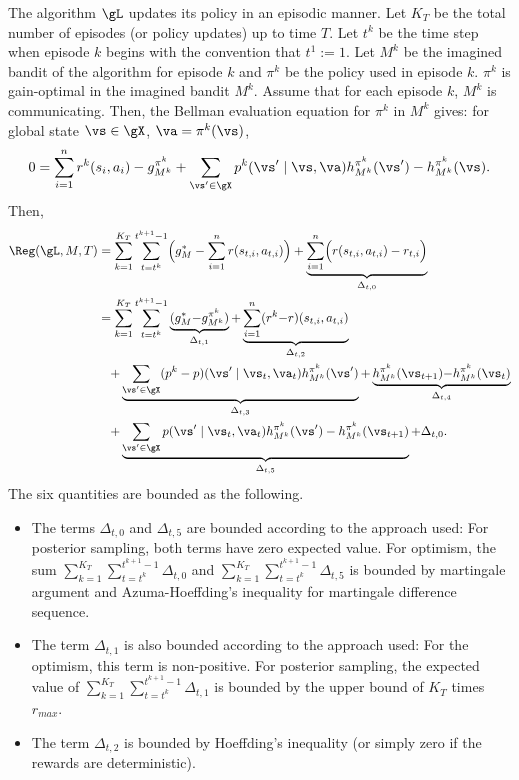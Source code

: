 The algorithm $\gL$ updates its policy in an episodic manner. %
Let $K_T$ be the total number of episodes (or policy updates) up to time $T$.
Let $t^k$ be the time step when episode $k$ begins with the convention that $t^1:=1$.
Let $M^k$ be the imagined bandit of the algorithm for episode $k$ and $\pi^k$ be the policy used in episode $k$.
$\pi^k$ is gain-optimal in the imagined bandit $M^k$.
Assume that for each episode $k$, $M^k$ is communicating.
Then, the Bellman evaluation equation for $\pi^k$ in $M^k$ gives: for global state $\vs\in\gX$, $\va=\pi^k(\vs)$,
\begin{align*}
    0 =  \sum_{i=1}^nr^k(s_i, a_i) -g^{\pi^k}_{M^k} +\sum_{\vs'\in\gX}p^k(\vs' \mid \vs, \va)h^{\pi^k}_{M^k}(\vs') -h^{\pi^k}_{M^k}(\vs).
\end{align*}
Then,
\begin{align*}
    \Reg(\gL, M, T)
    &= \sum_{k=1}^{K_T}\sum_{t=t^k}^{t^{k+1}-1} \Bigl(g^*_M -\sum_{i=1}^{n}r(s_{t,i},a_{t,i})\Bigr) +\underbrace{\sum_{i=1}^{n}\Bigl(r(s_{t,i},a_{t,i})-r_{t,i}\Bigr)}_{\Delta_{t,0}} \\
    &=\sum_{k=1}^{K_T}\sum_{t=t^k}^{t^{k+1}-1} \underbrace{(g^*_M{-}g^{\pi^k}_{M^k})}_{\Delta_{t,1}} {+}\underbrace{\sum_{i=1}^n(r^k{-}r)(s_{t,i},a_{t,i})}_{\Delta_{t,2}} \\
    &\quad {+}\underbrace{\sum_{\vs'\in\gX}(p^k-p)(\vs' \mid \vs_t, \va_t)h^{\pi^k}_{M^k}(\vs')}_{\Delta_{t,3}} {+}\underbrace{h^{\pi^k}_{M^k}(\vs_{t+1}){-}h^{\pi^k}_{M^k}(\vs_{t})}_{\Delta_{t,4}} \\
    &\quad {+}\underbrace{\sum_{\vs'\in\gX} p(\vs' \mid \vs_t, \va_t)h^{\pi^k}_{M^k}(\vs')-h^{\pi^k}_{M^k}(\vs_{t+1})}_{\Delta_{t,5}} +\Delta_{t,0}.
\end{align*}
The six quantities are bounded as the following. %

\begin{itemize}
    \item The terms $\Delta_{t,0}$ and $\Delta_{t,5}$ are bounded according to the approach used: For posterior sampling, both terms have zero expected value. For optimism, the sum $\sum_{k=1}^{K_T}\sum_{t=t^k}^{t^{k+1}-1}\Delta_{t,0}$ and $\sum_{k=1}^{K_T}\sum_{t=t^k}^{t^{k+1}-1}\Delta_{t,5}$ is bounded by martingale argument and Azuma-Hoeffding's inequality for martingale difference sequence.
    \item The term $\Delta_{t,1}$ is also bounded according to the approach used: For the optimism, this term is non-positive. For posterior sampling, the expected value of $\sum_{k=1}^{K_T}\sum_{t=t^k}^{t^{k+1}-1}\Delta_{t,1}$ is bounded by the upper bound of $K_T$ times $r_{max}$.
    \item The term $\Delta_{t,2}$ is bounded by Hoeffding's inequality (or simply zero if the rewards are deterministic).
\end{itemize}

